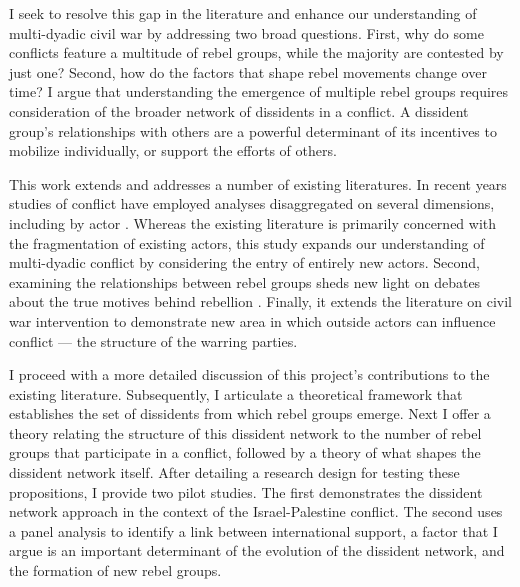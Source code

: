 I seek to resolve this gap in the literature and enhance our understanding of multi-dyadic civil war by addressing two broad questions. First, why do some conflicts feature a multitude of rebel groups, while the majority are contested by just one? Second, how do the factors that shape rebel movements change over time? I argue that understanding the emergence of multiple rebel groups requires consideration of the broader network of dissidents in a conflict. A dissident group's relationships with others are a powerful determinant of its incentives to mobilize individually, or support the efforts of others.

This work extends and addresses a number of existing literatures. In recent years studies of conflict have employed analyses disaggregated on several dimensions, including by actor \citep[e.g.][]{Cunningham2009,Pearlman2011a,Fjelde2012}. Whereas the existing literature is primarily concerned with the fragmentation of existing actors, this study expands our understanding of multi-dyadic conflict by considering the entry of entirely new actors. Second, examining the relationships between rebel groups sheds new light on debates about the true motives behind rebellion \citep[e.g.][]{Collier2004}. Finally, it extends the literature on civil war intervention to demonstrate new area in which outside actors can influence conflict --- the structure of the warring parties.

I proceed with a more detailed discussion of this project's contributions to the existing literature. Subsequently, I articulate a theoretical framework that establishes the set of dissidents from which rebel groups emerge. Next I offer a theory relating the structure of this dissident network to the number of rebel groups that participate in a conflict, followed by a theory of what shapes the dissident network itself. After detailing a research design for testing these propositions, I provide two pilot studies. The first demonstrates the dissident network approach in the context of the Israel-Palestine conflict. The second uses a panel analysis to identify a link between international support, a factor that I argue is an important determinant of the evolution of the dissident network, and the formation of new rebel groups.
